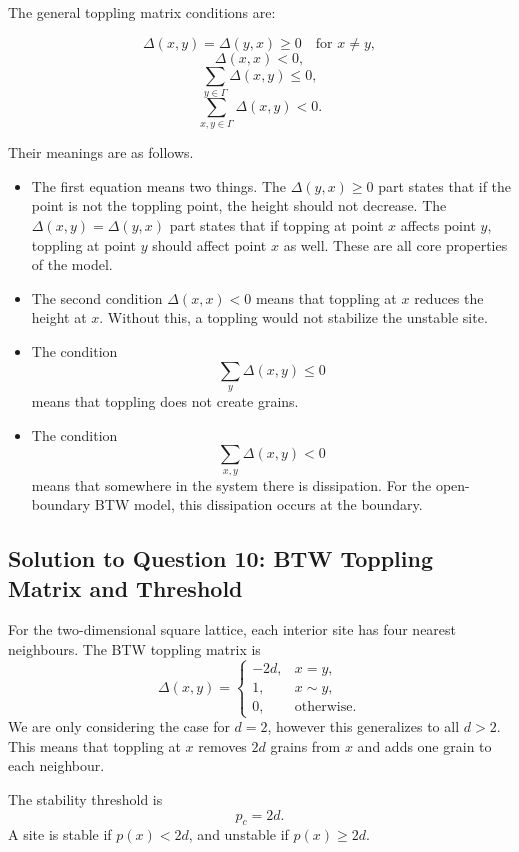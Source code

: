 \documentclass[11pt]{article}
\begin{document}
The general toppling matrix conditions are:

\[
    \Delta(x,y)=\Delta(y,x)\geq 0
    \quad \text{for } x\neq y,
\]
\[
    \Delta(x,x)<0,
\]
\[
    \sum_{y\in\Gamma}\Delta(x,y)\leq 0,
\]
\[
    \sum_{x,y\in\Gamma}\Delta(x,y)<0.
\]

Their meanings are as follows.

\begin{itemize}
    \item The first equation means two things. The  $\Delta(y,x)\geq 0$ part states that if the point is not the toppling point, the height should not decrease. The $\Delta(x,y)=\Delta(y,x)$ part states that if topping at point $x$ affects point $y$, toppling at point $y$ should affect point $x$ as well. These are all core properties of the model.

    \item  The second condition \(\Delta(x,x)<0\) means that toppling at \(x\) reduces the height at \(x\).  Without this, a toppling would not stabilize the unstable site.

    \item The condition
    \[
        \sum_y \Delta(x,y)\leq 0
    \]
    means that toppling does not create grains. 

    \item The condition
    \[
        \sum_{x,y}\Delta(x,y)<0
    \]
    means that somewhere in the system there is dissipation. 
    For the open-boundary BTW model, this dissipation occurs at the boundary. 
\end{itemize}

\subsection{Solution to Question 10: BTW Toppling Matrix and Threshold}

For the two-dimensional square lattice, each interior site has four nearest neighbours. 
The BTW toppling matrix is
\[
    \Delta(x,y)
    =
    \begin{cases}
        -2d, & x=y,\\
        1, & x\sim y,\\
        0, & \text{otherwise}.
    \end{cases}
\]
We are only considering the case for $d = 2$, however this generalizes to all $d > 2$.
This means that toppling at \(x\) removes $2d$ grains from \(x\) and adds one grain to each neighbour.

The stability threshold is
\[
    p_c = 2d.
\]
A site is stable if \(p(x)<2d\), and unstable if \(p(x)\geq 2d\).
\end{document}

